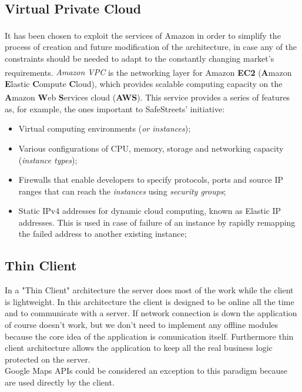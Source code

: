     \subsection{Virtual Private Cloud}
    It has been chosen to exploit the services of
    Amazon\textsuperscript{\textcopyright} in order to simplify the process of
    creation and future modification of the architecture, in case any of the
    constraints should be needed to adapt to the constantly changing market's
    requirements. \emph{Amazon\textsuperscript{\textcopyright} VPC} is the
    networking layer for Amazon\textsuperscript{\textcopyright} \textbf{EC2}
    (\textbf{A}mazon\textsuperscript{\textcopyright} \textbf{E}lastic
    \textbf{C}ompute \textbf{C}loud), which provides scalable computing capacity
    on the \textbf{A}mazon\textsuperscript{\textcopyright} \textbf{W}eb
    \textbf{S}ervices cloud (\textbf{AWS}). This service provides a series of
    features as, for example, the ones important to SafeStreets' initiative:
    \begin{itemize}
        \item Virtual computing environments (\emph{or instances});
        \item Various configurations of CPU, memory, storage and networking
        capacity (\emph{instance types});
        \item Firewalls that enable developers to specify protocols, ports and
        source IP ranges that can reach the \emph{instances} using
        \emph{security groups};
        \item Static IPv4 addresses for dynamic cloud computing, known as
        Elastic IP addresses. This is used in case of failure of an instance by
        rapidly remapping the failed address to another existing instance;
    \end{itemize}
    \subsection{Thin Client}
    In a "Thin Client" architecture the server does most of the work while the
    client is lightweight. In this architecture the client is designed to be
    online all the time and to communicate with a server. If network connection is down
    the application of course doesn't work, but we don't need to implement any
    offline modules because the core idea of the application is comunication
    itself. Furthermore thin client architecture allows the application to keep
    all the real business logic protected on the server. \\Google Maps APIs could
    be considered an exception to this paradigm because are used directly by the
    client.
     